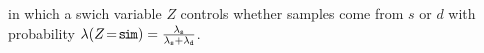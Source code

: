 \documentclass[twoside]{article}
\theoremstyle{plain}
\theoremstyle{definition}
\newcommand{\dg}[1]{\mathbdcal{#1}}
\begin{document}
in which a swich variable $Z$ controls whether samples come from $s$ or $d$
with probability $\lambda(Z\!=\!\texttt{s\kern-1.1pti\kern-0.8ptm}) = \frac{\lambda_{\texttt{s}}}{\lambda_{\texttt{s}} + \lambda_{\texttt{d}}}$.
\end{document}
